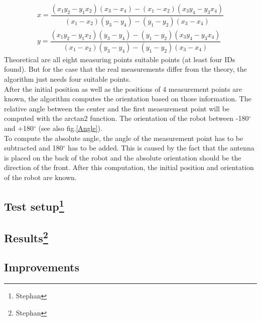 \begin{align}
x = \dfrac{(x_1y_2-y_1x_2)(x_3-x_4)-(x_1-x_2)(x_3y_4-y_3x_4)}{(x_1-x_2)(y_3-y_4)-(y_1-y_2)(x_3-x_4)} \\
y = \dfrac{(x_1y_2-y_1x_2)(y_3-y_4)-(y_1-y_2)(x_3y_4-y_3x_4)}{(x_1-x_2)(y_3-y_4)-(y_1-y_2)(x_3-x_4)}
\end{align}
Theoretical are all eight measuring points suitable points (at least four IDs found). But for the case that the real measurements differ from the theory, the algorithm just needs four suitable points. \\
After the initial position as well as the positions of 4 measurement points are known, the algorithm computes the orientation based on those information. The relative angle between the center and the first measurement point will be computed with the arctan2 function. The orientation of the robot between -180$^\circ$ and +180$^\circ$ (see also fig.\ref{Angle}). \\
To compute the absolute angle, the angle of the measurement point has to be subtracted and 180$^\circ$ has to be added. This is caused by the fact that the antenna is placed on the back of the robot and the absolute orientation should be the direction of the front. After this computation, the initial position and orientation of the robot are known. \\

\subsection[Test setup]{Test setup\footnote{Stephan}}

\subsection[Results]{Results\footnote{Stephan}}

\subsection{Improvements}

